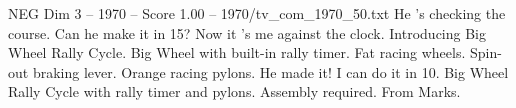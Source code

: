 \begin{textsample}{NEG Dim 3 – 1970 – Score 1.00 – 1970/tv\_com\_1970\_50.txt}  \label{ex:f3_neg_070}
He 's checking the course.
Can he make it in 15?
Now it 's me against the clock.
Introducing Big Wheel Rally Cycle.
Big Wheel with built-in rally timer.
Fat racing wheels.
Spin-out braking lever.
Orange racing pylons.
He made it!
I can do it in 10.
Big Wheel Rally Cycle with rally timer and pylons.
Assembly required.
From Marks.

\end{textsample}
